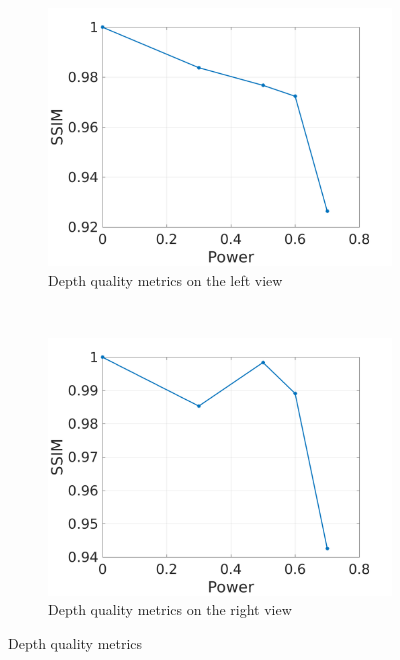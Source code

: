 \begin{figure}[h!]
    \centering
    \begin{subfigure}[t]{0.5\textwidth}
        \centering
\includegraphics[width=1\textwidth]{./img/qm/qm_right.png}
          \caption{\small{Depth quality metrics on the left view}}
\label{fig:qmcr}

    \end{subfigure}%
    ~ 
    \begin{subfigure}[t]{0.5\textwidth}
        \centering
\includegraphics[width=1\textwidth]{./img/qm/qm_disp_right.png}
           \caption{\small{Depth quality metrics on the right view}}
\label{fig:qmdr}
    \end{subfigure}
    \caption{Depth quality metrics }
        \label{fig:qmr}
\end{figure}
\clearpage

